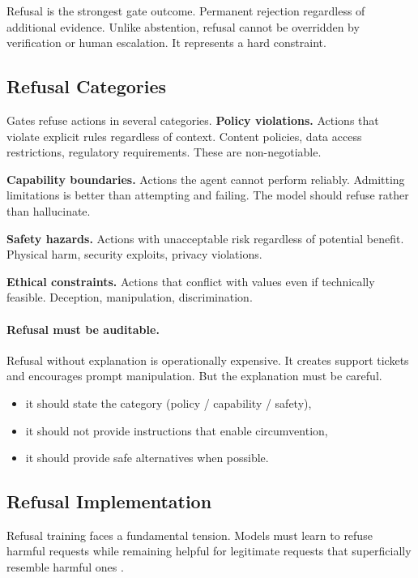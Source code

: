 Refusal is the strongest gate outcome. Permanent rejection regardless of additional evidence. Unlike abstention, refusal cannot be overridden by verification or human escalation. It represents a hard constraint.

\subsection{Refusal Categories}

Gates refuse actions in several categories. \textbf{Policy violations.} Actions that violate explicit rules regardless of context. Content policies, data access restrictions, regulatory requirements. These are non-negotiable.

\textbf{Capability boundaries.} Actions the agent cannot perform reliably. Admitting limitations is better than attempting and failing. The model should refuse rather than hallucinate.

\textbf{Safety hazards.} Actions with unacceptable risk regardless of potential benefit. Physical harm, security exploits, privacy violations.

\textbf{Ethical constraints.} Actions that conflict with values even if technically feasible. Deception, manipulation, discrimination.

\paragraph{Refusal must be auditable.}
Refusal without explanation is operationally expensive. It creates support tickets and encourages prompt manipulation. But the explanation must be careful.
\begin{itemize}
\item it should state the category (policy / capability / safety),
\item it should not provide instructions that enable circumvention,
\item it should provide safe alternatives when possible.
\end{itemize}

\subsection{Refusal Implementation}

Refusal training faces a fundamental tension. Models must learn to refuse harmful requests while remaining helpful for legitimate requests that superficially resemble harmful ones \cite{qi2024alignment}.


